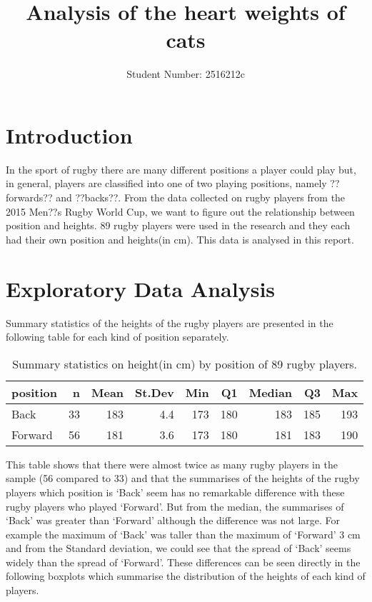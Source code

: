 \documentclass[
]{article}
\title{Analysis of the heart weights of cats}
\author{Student Number: 2516212c}
\date{}
\begin{document}
\maketitle

\hypertarget{sec:Intro}{%
\section{Introduction}\label{sec:Intro}}

In the sport of rugby there are many different positions a player could
play but, in general, players are classified into one of two playing
positions, namely ??forwards?? and ??backs??. From the data collected on
rugby players from the 2015 Men??s Rugby World Cup, we want to figure
out the relationship between position and heights. 89 rugby players were
used in the research and they each had their own position and heights(in
cm). This data is analysed in this report.

\hypertarget{sec:EDA}{%
\section{Exploratory Data Analysis}\label{sec:EDA}}

Summary statistics of the heights of the rugby players are presented in
the following table for each kind of position separately.

\begin{table}[!h]

\caption{\label{tab:summarises}\label{tab:summaries} Summary statistics on
height(in cm) by position of 89 rugby players.}
\centering
\begin{tabular}[t]{l|r|r|r|r|r|r|r|r}
\hline
position & n & Mean & St.Dev & Min & Q1 & Median & Q3 & Max\\
\hline
Back & 33 & 183 & 4.4 & 173 & 180 & 183 & 185 & 193\\
\hline
Forward & 56 & 181 & 3.6 & 173 & 180 & 181 & 183 & 190\\
\hline
\end{tabular}
\end{table}

This table shows that there were almost twice as many rugby players in
the sample (56 compared to 33) and that the summarises of the heights of
the rugby players which position is `Back' seem has no remarkable
difference with these rugby players who played `Forward'. But from the
median, the summarises of `Back' was greater than `Forward' although the
difference was not large. For example the maximum of `Back' was taller
than the maximum of `Forward' 3 cm and from the Standard deviation, we
could see that the spread of `Back' seems widely than the spread of
`Forward'. These differences can be seen directly in the following
boxplots which summarise the distribution of the heights of each kind of
players.
\end{document}
